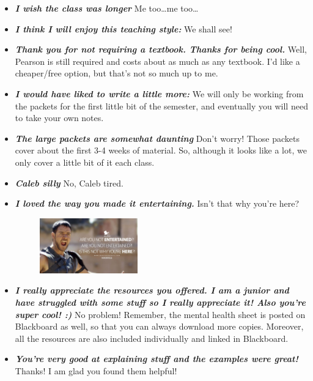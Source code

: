 \documentclass[11pt,letterpaper]{article}
\begin{document}
\begin{itemize}
\item {\bfseries\itshape I wish the class was longer} Me too\dots me too\dots

\item {\bfseries\itshape I think I will enjoy this teaching style:} We shall see!

\item {\bfseries\itshape Thank you for not requiring a textbook. Thanks for being cool.} Well, Pearson is still required and costs about as much as any textbook. I'd like a cheaper/free option, but that's not so much up to me. 

\item {\bfseries\itshape I would have liked to write a little more:} We will only be working from the packets for the first little bit of the semester, and eventually you will need to take your own notes. 

\item {\bfseries\itshape The large packets are somewhat daunting} Don't worry! Those packets cover about the first 3-4 weeks of material. So, although it looks like a lot, we only cover a little bit of it each class. 

\item {\bfseries\itshape Caleb silly} No, Caleb tired. 

\item {\bfseries\itshape I loved the way you made it entertaining.} Isn't that why you're here?
	\begin{figure}[H]
	\centering
	\includegraphics[width=0.40\textwidth]{images/entertained.jpg}
	\end{figure}

\item {\bfseries\itshape I really appreciate the resources you offered. I am a junior and have struggled with some stuff so I really appreciate it! Also you're super cool! :) } No problem! Remember, the mental health sheet is posted on Blackboard as well, so that you can always download more copies. Moreover, all the resources are also included individually and linked in Blackboard. 

\item {\bfseries\itshape You're very good at explaining stuff and the examples were great!} Thanks! I am glad you found them helpful! 


\end{itemize}
\end{document}
